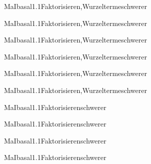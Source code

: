 \documentclass[12pt]{article}
\begin{document}
    \begin{Add}{MaI}{basal1.1}{Faktorisieren,Wurzelterme}{schwerer}
    \solution{ }
    \end{Add}
    \begin{Add}{MaI}{basal1.1}{Faktorisieren,Wurzelterme}{schwerer}
    \end{Add}
    

    \begin{Add}{MaI}{basal1.1}{Faktorisieren,Wurzelterme}{schwerer}
    \solution{ }
    \end{Add}
    \begin{Add}{MaI}{basal1.1}{Faktorisieren,Wurzelterme}{schwerer}
    \end{Add}
    

    \begin{Add}{MaI}{basal1.1}{Faktorisieren,Wurzelterme}{schwerer}
    \solution{ }
    \end{Add}
    \begin{Add}{MaI}{basal1.1}{Faktorisieren,Wurzelterme}{schwerer}
    \end{Add}
    

    \begin{Add}{MaI}{basal1.1}{Faktorisieren}{schwerer}
    \solution{ }
    \end{Add}
    \begin{Add}{MaI}{basal1.1}{Faktorisieren}{schwerer}
    \end{Add}
    

    \begin{Add}{MaI}{basal1.1}{Faktorisieren}{schwerer}
    \solution{ }
    \end{Add}
    \begin{Add}{MaI}{basal1.1}{Faktorisieren}{schwerer}
    \end{Add}
    
\end{document}
